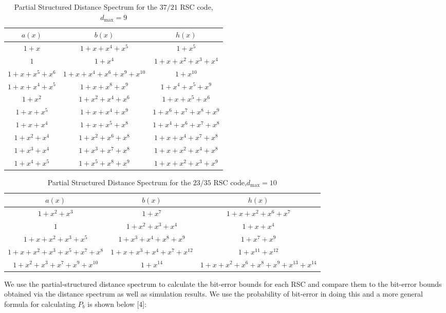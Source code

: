 \begin{table*}[h!]
 \caption{Partial Structured Distance Spectrum for the $37/21$ RSC code,$d_{\text{max}}=9$}
\centering
 \begin{tabular}{c c c} 
 \hline
 $a(x)$ & $b(x)$ & $h(x)$ \\ [0.5ex] 
 \hline\hline
$1+x$ & $1+x+x^{4}+x^5$ & $1+x^5$\\
\hline
$1$ & $1+x^4$ & $1+x+x^2+x^3+x^4$\\
\hline
$1+x+x^5+x^6$ & $1+x+x^4+x^6+x^9+x^{10}$ & $1+x^{10}$\\
\hline
$1+x+x^4+x^5$ & $1+x+x^8+x^9$ & $1+x^4+x^5+x^9$\\
\hline
$1+x^2$ & $1+x^2+x^4+x^6$ & $1+x+x^5+x^6$\\
\hline
$1+x+x^5$ & $1+x+x^4+x^9$ & $1+x^6+x^7+x^8+x^9$\\
\hline
$1+x+x^4$ & $1+x+x^5+x^8$ & $1+x^4+x^6+x^7+x^8$\\
\hline
$1+x^2+x^4$ & $1+x^2+x^6+x^8$ & $1+x+x^4+x^7+x^8$\\
\hline
$1+x^3+x^4$& $1+x^3+x^7+x^8$ & $1+x+x^2+x^4+x^8$\\
\hline
$1+x^4+x^5$ & $1+x^5+x^8+x^9$ & $1+x+x^2+x^3+x^9$\\
 \end{tabular}
 
 \label{novelTab14}
\end{table*}

\begin{table*}[h!]
 \caption{Partial Structured Distance Spectrum for the $23/35$ RSC code,$d_{\text{max}}=10$}
\centering
 \begin{tabular}{c c c} 
 \hline
 $a(x)$ & $b(x)$ & $h(x)$ \\ [0.5ex] 
 \hline\hline
$1+x^2+x^3$ & $1+x^7$ & $1+x+x^2+x^6+x^7$\\
\hline
$1$ & $1+x^2+x^3+x^4$ & $1+x+x^{4}$\\
\hline
$1+x+x^2+x^3+x^5$ & $1+x^3+x^4+x^8+x^9$ & $1+x^7+x^9$\\
\hline
$1+x+x^2+x^3+x^5+x^7+x^8$ & $1+x+x^3+x^4+x^7+x^{12}$ & $1+x^{11}+x^{12}$\\
\hline
$1+x^2+x^3+x^7+x^9+x^{10}$ & $1+x^{14}$ & $1+x+x^2+x^6+x^8+x^9+x^{13}+x^{14}$\\
 \end{tabular}
 
 \label{novelTab15}
\end{table*}
\newpage
We use the partial-structured distance spectrum to calculate the bit-error bounds for each RSC and compare them to the bit-error bounds obtained via the distance spectrum as well as simulation results. We use the probability of bit-error in doing this and a more general formula for calculating $P_b$ is shown below [4]:

